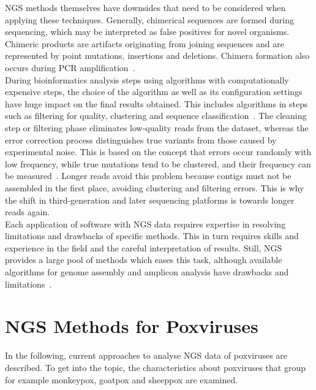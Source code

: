 NGS methods themselves have downsides that need to be considered when applying these techniques. Generally, chimerical sequences are formed during sequencing, which may be interpreted as false positives for novel organisms. Chimeric products are artifacts originating from joining sequences and are represented by point mutations, insertions and deletions. Chimera formation also occurs during PCR amplification~\cite{zylstra1998pcr}.\\
During bioinformatics analysis steps using algorithms with computationally expensive steps, the choice of the algorithm as well as its configuration settings have huge impact on the final results obtained. This includes algorithms in steps such as filtering for quality, clustering and sequence classification~\cite{kopylova2016open}. The cleaning step or filtering phase eliminates low-quality reads from the dataset, whereas the error correction process distinguishes true variants from those caused by experimental noise. This is based on the concept that errors occur randomly with low frequency, while true mutations tend to be clustered, and their frequency can be measured~\cite{zagordi2010error}. Longer reads avoid this problem because contigs must not be assembled in the first place, avoiding clustering and filtering errors. This is why the shift in third-generation and later sequencing platforms is towards longer reads again. \\
Each application of software with NGS data requires expertise in resolving limitations and drawbacks of specific methods. This in turn requires skills and experience in the field and the careful interpretation of results. Still, NGS provides a large pool of methods which eases this task, although available algorithms for genome assembly and amplicon analysis have drawbacks and limitations~\cite{finotello2012comparative}.

\section{NGS Methods for Poxviruses}
In the following, current approaches to analyse NGS data of poxviruses are described. To get into the topic, the characteristics about poxviruses that group for example monkeypox, goatpox and sheeppox are examined.

